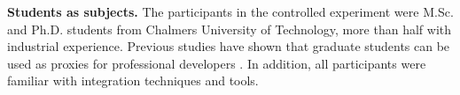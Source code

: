 \textbf{Students as subjects.} The participants in the controlled experiment were M.Sc. and Ph.D. students from Chalmers University of Technology, more than half with industrial experience. Previous studies have shown that graduate students can be used as proxies for professional developers \cite{buse2011}. In addition, all participants were familiar with integration techniques and tools.
